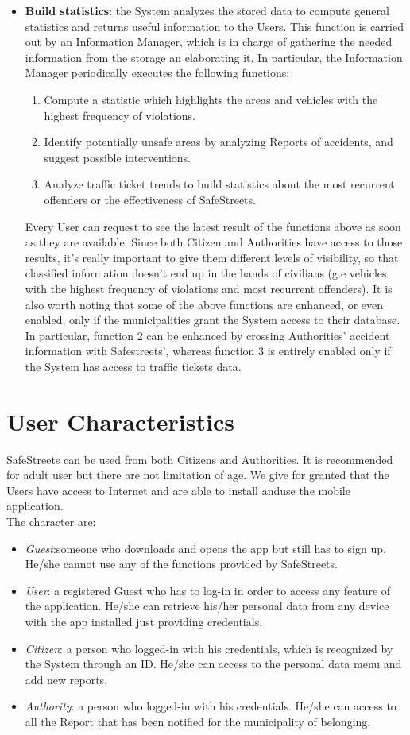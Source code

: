\documentclass{report}
\begin{document}
\begin{itemize}
	\item \textbf{Build statistics}: the System analyzes the stored data to compute general statistics and returns useful information to the Users. This function is carried out by an Information Manager, which is in charge of gathering the needed information from the storage an elaborating it. In particular, the Information Manager periodically executes the following functions:
	\begin{enumerate}
		\item Compute a statistic which highlights the areas and vehicles with the highest frequency of violations.
		\item Identify potentially unsafe areas by analyzing Reports of accidents, and suggest possible interventions.
		\item Analyze traffic ticket trends to build statistics about the most recurrent offenders or the effectiveness of SafeStreets.
	\end{enumerate}
	Every User can request to see the latest result of the functions above as soon as they are available. Since both Citizen and Authorities have access to those results, it's really important to give them different levels of visibility, so that classified information doesn't end up in the hands of civilians (g.e vehicles with the highest frequency of violations and most recurrent offenders). It is also worth noting that some of the above functions are enhanced, or even enabled, only if the municipalities grant the System access to their database. In particular, function 2 can be enhanced by crossing Authorities' accident information with Safestreets', whereas function 3 is entirely enabled only if the System has access to traffic tickets data.

\end{itemize}
\newpage
\section{User Characteristics}
SafeStreets can be used from both Citizens and Authorities. It is recommended for adult user but there are not limitation of age. 
We give for granted that the Users have access to Internet and are able to install anduse the mobile application.\\
The character are:
\begin{itemize}
	\item \textit{Guest}:someone who downloads and opens the app but still has to sign
	up. He/she cannot use any of the functions provided by SafeStreets.
	\item \textit{User}: a registered Guest who has to log-in in order to access any feature of the application. He/she can retrieve his/her personal data from any
	device with the app installed just providing credentials.
	\item \textit{Citizen}: a person who logged-in with his credentials, which is recognized by the System through an ID. He/she can access to the personal data menu and add new reports.
	\item \textit{Authority}: a person who logged-in with his credentials. He/she can access to all the Report that has been notified for the municipality of belonging.
\end{itemize}
\end{document}
